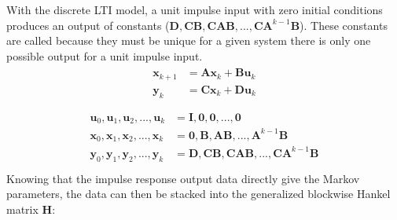 \documentclass[letterpaper,10pt,english]{sphinxmanual}
\begin{document}
\sphinxAtStartPar
With the discrete LTI model, a unit impulse input with zero initial
conditions produces an output of constants
(\(\mathbf{D,CB,CAB,...,CA}^{k-1}\mathbf{B}\)). These constants are
called  because they must be unique for a given
system \textendash{} there is only one possible output for a unit impulse input.
\begin{equation*}
\begin{split}\begin{aligned}
    \mathbf{x}_{k+1} &= \mathbf{Ax}_{k} + \mathbf{Bu}_{k} \\
    \mathbf{y}_{k} &= \mathbf{Cx}_{k} + \mathbf{Du}_{k} \\
\end{aligned}\end{split}
\end{equation*}\begin{equation*}
\begin{split}\begin{aligned}
    \mathbf{u}_{0},\mathbf{u}_{1},\mathbf{u}_{2},...,\mathbf{u}_{k} &= \mathbf{I,0,0,...,0} \\
    \mathbf{x}_{0},\mathbf{x}_{1},\mathbf{x}_{2},...,\mathbf{x}_{k} &= \mathbf{0,B,AB,...,A}^{k-1}\mathbf{B} \\
    \mathbf{y}_{0},\mathbf{y}_{1},\mathbf{y}_{2},...,\mathbf{y}_{k} &= \mathbf{D,CB,CAB,...,CA}^{k-1}\mathbf{B} \\
\end{aligned}\end{split}
\end{equation*}
\sphinxAtStartPar
Knowing that the impulse response output data directly give the Markov
parameters, the data can then be stacked into the generalized blockwise
Hankel matrix \(\mathbf{H}\):
\end{document}
